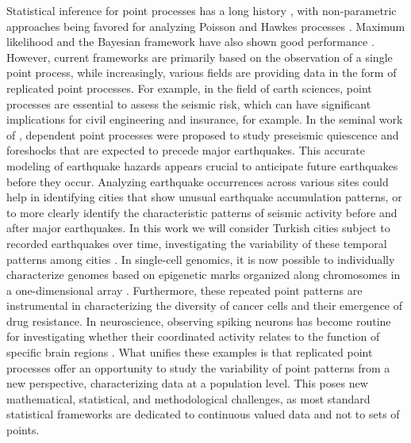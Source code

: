 \documentclass[aos]{imsart}
\theoremstyle{plain}
\theoremstyle{remark}
\newcommand{\1}{1}
\begin{document}
Statistical inference for point processes has a long history \cite{Karr, Andersen}, with non-parametric approaches being favored for analyzing Poisson \cite{Kolaczyk, Patou, Willet-Nowak, MR3390131} and Hawkes processes \cite{Reynaud_Bouret_2010, Hansen:Reynaud:Rivoirard, MR4095329, Witten}. Maximum likelihood \cite{ogata1988statistical, MR961117, Anna} and the Bayesian framework have also shown good performance \cite{Rasmussen2013, HawkesBay1, HawkesBay2}. However, current frameworks are primarily based on the observation of a single point process, while increasingly, various fields are providing data in the form of replicated point processes. For example, in the field of earth sciences, point processes are essential to assess the seismic risk, which can have significant implications for civil engineering and insurance, for example. In the seminal work of \cite{ogata1988statistical}, dependent point processes were proposed to study preseismic quiescence and foreshocks that are expected to precede major earthquakes. This accurate modeling of earthquake hazards appears crucial to anticipate future earthquakes before they occur. Analyzing earthquake occurrences across various sites could help in identifying cities that show unusual earthquake accumulation patterns, or to more clearly identify the characteristic patterns of seismic activity before and after major earthquakes. In this work we will consider Turkish cities subject to recorded earthquakes over time, investigating the variability of these temporal patterns among cities \cite{Karasozen_etal_2018}. In single-cell genomics, it is now possible to individually characterize genomes based on epigenetic marks organized along chromosomes in a one-dimensional array \cite{zheng_massively_2017}. Furthermore, these repeated point patterns are instrumental in characterizing the diversity of cancer cells and their emergence of drug resistance. In neuroscience, observing spiking neurons has become routine for investigating whether their coordinated activity relates to the function of specific brain regions \cite{Cunningham2014}.  What unifies these examples is that replicated point processes offer an opportunity to study the variability of point patterns from a new perspective, characterizing data at a population level. This poses new mathematical, statistical, and methodological challenges, as most standard statistical frameworks are dedicated to continuous valued data and not to sets of points.
\end{document}
